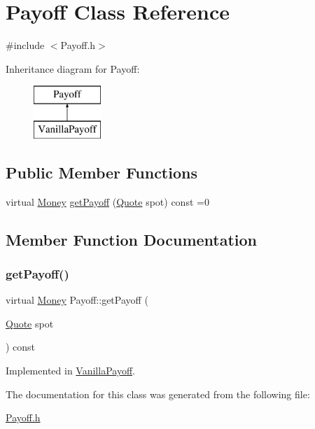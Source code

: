 \hypertarget{class_payoff}{}\section{Payoff Class Reference}
\label{class_payoff}


{\ttfamily \#include $<$Payoff.\+h$>$}

Inheritance diagram for Payoff\+:\begin{figure}[H]
\begin{center}
\leavevmode
\includegraphics[height=2.000000cm]{class_payoff}
\end{center}
\end{figure}
\subsection*{Public Member Functions}
\begin{DoxyCompactItemize}
\item 
virtual \hyperlink{_name_def_8h_a5a9d48c16a694e9a2d9f1eca730dc8c5}{Money} \hyperlink{class_payoff_a908e732330294a111345b4183ddb025b}{get\+Payoff} (\hyperlink{_name_def_8h_a642a6c5fd87319d922637de0e0bb0305}{Quote} spot) const =0
\end{DoxyCompactItemize}


\subsection{Member Function Documentation}
\hypertarget{class_payoff_a908e732330294a111345b4183ddb025b}{}\label{class_payoff_a908e732330294a111345b4183ddb025b} 
\subsubsection{\texorpdfstring{get\+Payoff()}{getPayoff()}}
{\footnotesize\ttfamily virtual \hyperlink{_name_def_8h_a5a9d48c16a694e9a2d9f1eca730dc8c5}{Money} Payoff\+::get\+Payoff (\begin{DoxyParamCaption}\item[{\hyperlink{_name_def_8h_a642a6c5fd87319d922637de0e0bb0305}{Quote}}]{spot }\end{DoxyParamCaption}) const\hspace{0.3cm}{\ttfamily [pure virtual]}}



Implemented in \hyperlink{class_vanilla_payoff_aa141f5b29c30d54448c93a21bef83bb3}{Vanilla\+Payoff}.



The documentation for this class was generated from the following file\+:\begin{DoxyCompactItemize}
\item 
\hyperlink{_payoff_8h}{Payoff.\+h}\end{DoxyCompactItemize}

